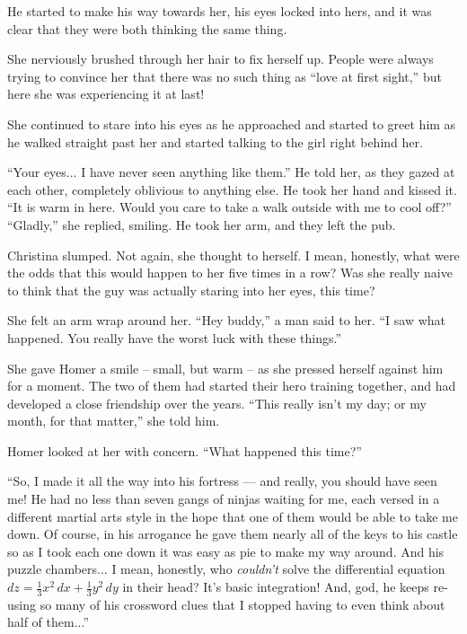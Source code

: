 He started to make his way towards her, his eyes locked into hers, and it was clear that they were both thinking the same thing.

She nerviously brushed through her hair to fix herself up.  People were always trying to convince her that there was no such thing as ``love at first sight,'' but here she was experiencing it at last!

She continued to stare into his eyes as he approached and started to greet him as he walked straight past her and started talking to the girl right behind her.

``Your eyes... I have never seen anything like them.''  He told her, as they gazed at each other, completely oblivious to anything else.  He took her hand and kissed it.  ``It is warm in here.  Would you care to take a walk outside with me to cool off?''  ``Gladly,'' she replied, smiling.  He took her arm, and they left the pub.

Christina slumped.  Not again, she thought to herself.  I mean, honestly, what were the odds that this would happen to her five times in a row?  Was she really naive to think that the guy was actually staring into her eyes, this time?

She felt an arm wrap around her.  ``Hey buddy,'' a man said to her.  ``I saw what happened.  You really have the worst luck with these things.''

She gave Homer a smile -- small, but warm -- as she pressed herself against him for a moment.  The two of them had started their hero training together, and had developed a close friendship over the years.  ``This really isn't my day;  or my month, for that matter,'' she told him.

Homer looked at her with concern.  ``What happened this time?''

``So, I made it all the way into his fortress --- and really, you should have seen me!  He had no less than seven gangs of ninjas waiting for me, each versed in a different martial arts style in the hope that one of them would be able to take me down.  Of course, in his arrogance he gave them nearly all of the keys to his castle so as I took each one down it was easy as pie to make my way around.  And his puzzle chambers... I mean, honestly, who \emph{couldn't} solve the differential equation $dz=\frac{1}{3}x^2\,dx+\frac{1}{3}y^2\,dy$ in their head?  It's basic integration!  And, god, he keeps re-using so many of his crossword clues that I stopped having to even think about half of them...''

